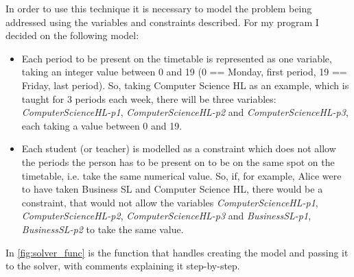 \documentclass[12pt]{article}
\begin{document}
In order to use this technique it is necessary to model the problem being addressed using
the variables and constraints described. For my program I decided on the following model:
%
\begin{itemize}
    \item Each period to be present on the timetable is represented as one variable, taking
        an integer value between 0 and 19 (0 == Monday, first period, 19 == Friday, last
        period). So, taking Computer Science HL as an example, which is taught for 3 periods
        each week, there will be three variables: \textit{ComputerScienceHL-p1},
        \textit{ComputerScienceHL-p2} and \textit{ComputerScienceHL-p3}, each taking a value
        between 0 and 19.

    \item Each student (or teacher) is modelled as a constraint which does not allow the
        periods the person has to be present on to be on the same spot on the timetable,
        i.e. take the same numerical value. So, if, for example, Alice were to have taken
        Business SL and Computer Science HL, there would be a constraint, that would not
        allow the variables \textit{ComputerScienceHL-p1}, \textit{ComputerScienceHL-p2},
        \textit{ComputerScienceHL-p3} and \textit{BusinessSL-p1}, \textit{BusinessSL-p2} to
        take the same value.
\end{itemize}
%

In \autoref{fig:solver_func} is the function that handles creating the model and passing it
to the solver, with comments explaining it step-by-step.

\begin{figure}[H]
    \caption{}
    \inputminted{python}{solver_listing.py}
    \label{fig:solver_func}
\end{figure}

\printbibliography[type={software},title={Software \& Libraries}]
\printbibliography[type={online}, title={References}]
\end{document}
